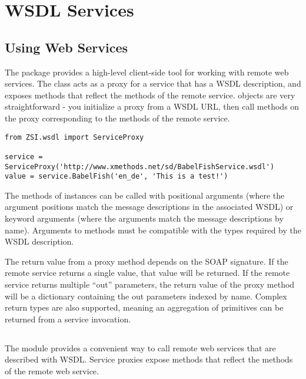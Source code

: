 \chapter{WSDL Services}


\section{Using Web Services}

The  package provides a high-level client-side tool
for working with remote web services. The  class acts 
as a proxy for a service that has a WSDL description, and exposes methods 
that reflect the methods of the remote service.  objects 
are very straightforward - you initialize a proxy from a WSDL URL, then call 
methods on the proxy corresponding to the methods of the remote service.

\begin{verbatim}
from ZSI.wsdl import ServiceProxy

service = ServiceProxy('http://www.xmethods.net/sd/BabelFishService.wsdl')
value = service.BabelFish('en_de', 'This is a test!')
\end{verbatim}

The methods of  instances can be called with positional 
arguments (where the argument positions match the message descriptions in the 
associated WSDL) or keyword arguments (where the arguments match the message 
descriptions by name). Arguments to  methods must be  
compatible with the types required by the WSDL description.

The return value from a proxy method depends on the SOAP signature. If the 
remote service returns a single value, that value will be returned. If the 
remote service returns multiple ``out'' parameters, the return value of the 
proxy method will be a dictionary containing the out parameters indexed by 
name.  Complex return types are also supported, meaning an aggregation of
primitives can be returned from a service invocation.

\section{}

The  module provides a convenient way to call 
remote web services that are described with WSDL. Service proxies 
expose methods that reflect the methods of the remote web service. 


